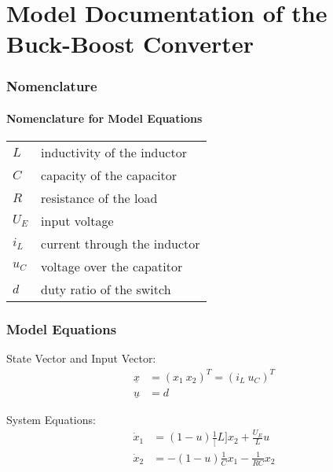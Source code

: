 \documentclass[10pt,a4paper]{article}
\begin{document}
	\part*{Model Documentation of the \\ Buck-Boost Converter} %
	
	
	\section{Nomenclature} %
	\subsection{Nomenclature for Model Equations} %
	
	\begin{tabular}{ll}
		$L$ & inductivity of the inductor \\
		$C$ & capacity of the capacitor \\
		$R$ & resistance of the load \\
		$U_E$ & input voltage \\
		$i_L$ & current through the inductor \\
		$u_C$ & voltage over the capatitor \\
		$d$ & duty ratio of the switch \\

		
				
	\end{tabular}
	 
	
	
	\section{Model Equations} %
	
	State Vector and Input Vector:
	\begin{align*}
		\underline{x} &= (x_1 \ x_2)^T = (i_L \ u_C)^T \\
		\underline{u} &= d
	\end{align*}
	
	\noindent System Equations:			
	\begin{subequations}
	\begin{align}
		\dot{x}_1 &= (1-u)\frac{1}[L]x_2 + \frac{U_E}{L}u \\
		\dot{x}_2 &= -(1-u)\frac{1}{C}x_1 - \frac{1}{RC}x_2
	\end{align}
	\end{subequations}
\end{document}
